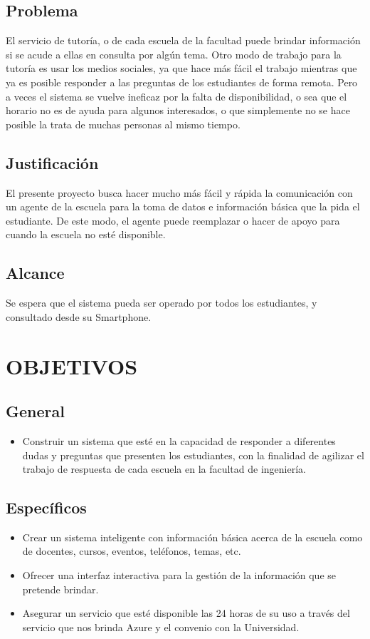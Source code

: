\documentclass[12pt,letterpaper]{article}
\begin{document}
	\subsection{Problema}
El servicio de tutoría, o de cada escuela de la facultad puede brindar información si se acude a ellas en consulta por algún tema. Otro modo de trabajo para la tutoría es usar los medios sociales, ya que hace más fácil el trabajo mientras que ya es posible responder a las preguntas de los estudiantes de forma remota. Pero a veces el sistema se vuelve ineficaz por la falta de disponibilidad, o sea que el horario no es de ayuda para algunos interesados, o que simplemente no se hace posible la trata de muchas personas al mismo tiempo.\\
	\subsection{Justificación}
El presente proyecto busca hacer mucho más fácil y rápida la comunicación con un agente de la escuela para la toma de datos e información básica que la pida el estudiante. De este modo, el agente puede reemplazar o hacer de apoyo para cuando la escuela no esté disponible.
	\subsection{Alcance}
Se espera que el sistema pueda ser operado por todos los estudiantes, y consultado desde su Smartphone.

\section{OBJETIVOS}
	\subsection{General}
\begin{itemize}
	\item Construir un sistema que esté en la capacidad de responder a diferentes dudas y preguntas que presenten los estudiantes, con la finalidad de agilizar el trabajo de respuesta de cada escuela en la facultad de ingeniería.
\end{itemize}

	\subsection{Específicos}
\begin{itemize}
	\item Crear un sistema inteligente con información básica acerca de la escuela como de docentes, cursos, eventos, teléfonos, temas, etc.
	\item Ofrecer una interfaz interactiva para la gestión de la información que se pretende brindar.
	\item Asegurar un servicio que esté disponible las 24 horas de su uso a través del servicio que nos brinda Azure y el convenio con la Universidad.
\end{itemize}
\end{document}
